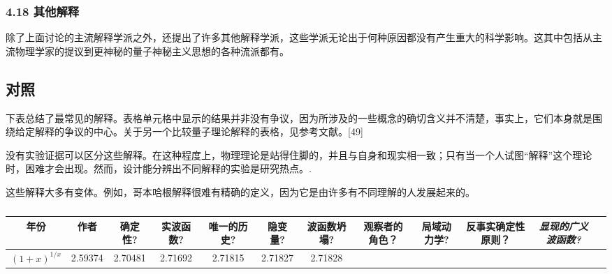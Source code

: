 \subsubsection{4.18 其他解释}

除了上面讨论的主流解释学派之外，还提出了许多其他解释学派，这些学派无论出于何种原因都没有产生重大的科学影响。这其中包括从主流物理学家的提议到更神秘的量子神秘主义思想的各种流派都有。

\subsection{对照}

下表总结了最常见的解释。表格单元格中显示的结果并非没有争议，因为所涉及的一些概念的确切含义并不清楚，事实上，它们本身就是围绕给定解释的争议的中心。关于另一个比较量子理论解释的表格，见参考文献。[49]

没有实验证据可以区分这些解释。在这种程度上，物理理论是站得住脚的，并且与自身和现实相一致；只有当一个人试图“解释”这个理论时，困难才会出现。然而，设计能分辨出不同解释的实验是研究热点。.

这些解释大多有变体。例如，哥本哈根解释很难有精确的定义，因为它是由许多有不同理解的人发展起来的。

\begin{table}[ht]
\centering
\caption\label{tab_QMinte}
\begin{tabular}{|c|c|c|c|c|c|c|c|c|c|c|c|}
\hline
\textbf{年份}& \textbf{作者}& \textbf{确定性?} & \textbf{实波函数?} & \textbf{唯一的历史?} & \textbf{隐变量?} & \textbf{波函数坍塌?}&\textbf{观察者的角色？}&\textbf{局域动力学?}&\textbf{反事实确定性原则？}&\textsl{显现的广义波函数?} \\
\hline
$(1 + x)^{1/x}$ & 2.59374 & 2.70481 & 2.71692 & 2.71815 & 2.71827 & 2.71828 \\
\hline
\end{tabular}
\end{table}